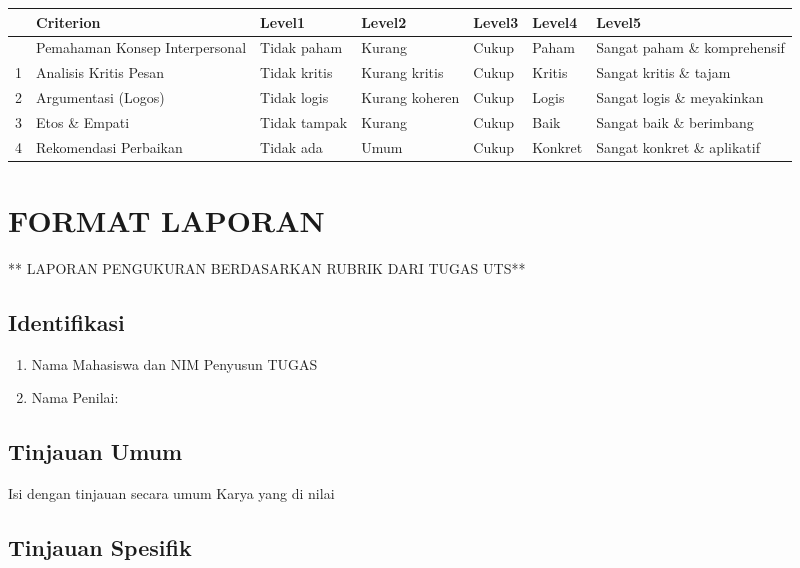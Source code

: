 \documentclass[
  letterpaper,
  DIV=11,
  numbers=noendperiod]{scrreprt}
\providecommand{\tightlist}{%
  \setlength{\itemsep}{0pt}\setlength{\parskip}{0pt}}
\begin{document}
\begin{landscape}
\begin{longtable}[]{@{}lllllll@{}}
\toprule\noalign{}
& Criterion & Level1 & Level2 & Level3 & Level4 & Level5 \\
\midrule\noalign{}
\endhead
\bottomrule\noalign{}
\endlastfoot
0 & Pemahaman Konsep Interpersonal & Tidak paham & Kurang & Cukup &
Paham & Sangat paham \& komprehensif \\
1 & Analisis Kritis Pesan & Tidak kritis & Kurang kritis & Cukup &
Kritis & Sangat kritis \& tajam \\
2 & Argumentasi (Logos) & Tidak logis & Kurang koheren & Cukup & Logis &
Sangat logis \& meyakinkan \\
3 & Etos \& Empati & Tidak tampak & Kurang & Cukup & Baik & Sangat baik
\& berimbang \\
4 & Rekomendasi Perbaikan & Tidak ada & Umum & Cukup & Konkret & Sangat
konkret \& aplikatif \\

\end{longtable}

\end{landscape}

\chapter{FORMAT LAPORAN}\label{format-laporan}

** LAPORAN PENGUKURAN BERDASARKAN RUBRIK DARI TUGAS UTS**

\section{Identifikasi}\label{identifikasi}

\begin{enumerate}
\def\labelenumi{\arabic{enumi}.}
\tightlist
\item
  Nama Mahasiswa dan NIM Penyusun TUGAS
\item
  Nama Penilai:
\end{enumerate}

\section{Tinjauan Umum}\label{tinjauan-umum}

Isi dengan tinjauan secara umum Karya yang di nilai

\section{Tinjauan Spesifik}\label{tinjauan-spesifik}
\end{document}
